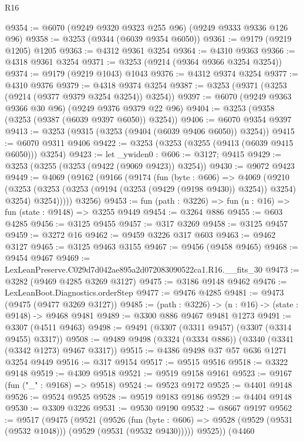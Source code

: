 \begin{lexlean}{R16}
\begin{coremodule}
@9354 := @6070 (@9249 @9320 @9323 @255 @96) (@9249 @9333 @9336 @126 @96)
@9358 := @3253 (@9344 (@6039 @9354 @6050))
@9361 := @9179 (@9219 @1205) @1205
@9363 := @4312 @9361 @3254
@9364 := @4310 @9363
@9366 := @4318 @9361 @3254
@9371 := @3253 (@9214 (@9364 @9366 @3254 @3254))
@9374 := @9179 (@9219 @1043) @1043
@9376 := @4312 @9374 @3254
@9377 := @4310 @9376
@9379 := @4318 @9374 @3254
@9387 := @3253 (@9371 (@3253 (@9214 (@9377 @9379 @3254 @3254)) @3254))
@9397 := @6070 (@9249 @9363 @9366 @30 @96) (@9249 @9376 @9379 @22 @96)
@9404 := @3253 (@9358 (@3253 (@9387 (@6039 @9397 @6050)) @3254))
@9406 := @6070 @9354 @9397
@9413 := @3253 (@9315 (@3253 (@9404 (@6039 @9406 @6050)) @3254))
@9415 := @6070 @9311 @9406
@9422 := @3253 (@3253 (@3255 (@9413 (@6039 @9415 @6050))) @3254)
@9423 := let _ywiden0 : @606 := @3127; @9415
@9429 := @3253 (@3255 (@3253 (@9422 (@9069 @9423)) @3254))
@9430 := @9072 @9423
@9449 := @4069
    (@9162
      (@9166
        (@9174
          (fun (byte : @606) =>
          @4069
            (@9210
              (@3253
                (@3253 (@3253 (@9194 (@3253 (@9429 (@9198 @9430)) @3254)) @3254) @3254)
                @3254)))))
      @3256)
@9453 := fun (path : @3226) => fun (n : @16) => fun (state : @9148) => @3255 @9449
@9454 := @3264 @886
@9455 := @603 @4285
@9456 := @3125 @9455
@9457 := @317 @3269
@9458 := @3125 @9457
@9459 := @3272 @16
@9462 := @9459 @3226 @317 @603
@9463 := @9462 @3127
@9465 := @3125 @9463 @3155
@9467 := @9456 (@9458 @9465)
@9468 := @9454 @9467
@9469 := LexLeanPreserve.C029d7d042ae895a2d072083090522ca1.R16.__fits_30
@9473 := @3282 (@9469 @4285 @3269 @3127)
@9475 := @3186 @9148 @9462
@9476 := LexLeanBoot.Diagnostics.orderStep
@9477 := @9476 @4285
@9481 := @9473 (@9475 (@9477 @3269 @3127))
@9485 := (path : @3226) -> (n : @16) -> (state : @9148) -> @9468 @9481
@9489 := @3300 @886 @9467 @9481 @1273
@9491 := @3307 (@4511 @9463)
@9498 := @9491 (@3307 (@3311 @9457) (@3307 (@3314 @9455) @3317))
@9508 := @9489 @9498 (@3324 (@3334 @886)) (@3340 (@3341 (@3342 @1273) @9467 @3317))
@9515 := @4386 @9498 @37 @57 @636 @1271 @3254 @9449
@9516 := @317 @9154
@9517 := @9515 @9516
@9518 := @3322 @9148
@9519 := @4309 @9518
@9521 := @9519 @9158 @9161
@9523 := @9167 (fun ("_" : @9168) => @9518)
@9524 := @9523 @9172
@9525 := @4401 @9148
@9526 := @9524 @9525
@9528 := @9519 @9183 @9186
@9529 := @4404 @9148
@9530 := @3309 @3226
@9531 := @9530 @9190
@9532 := @8667 @9197
@9562 := @9517
    (@9475
      (@9521
        (@9526
          (fun (byte : @606) => @9528 (@9529 (@9531 (@9532 @1048))) (@9529 (@9531 (@9532 @9430)))))
        @9525))
    (@4460

\end{coremodule}
\end{lexlean}
